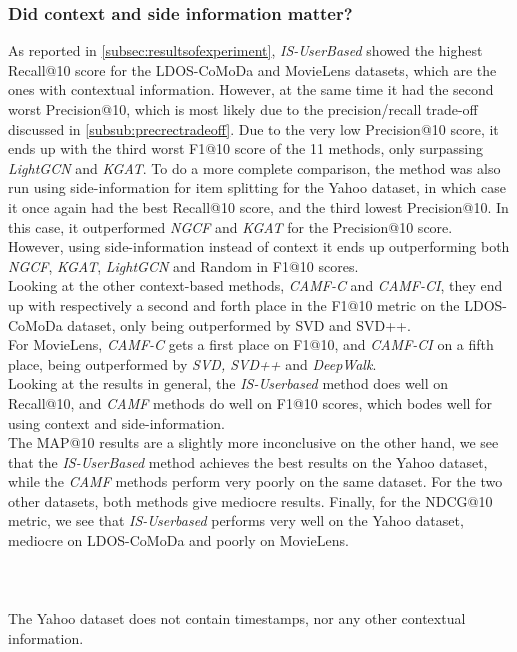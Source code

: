 \subsubsection{Did context and side information matter?}
As reported in \autoref{subsec:resultsofexperiment}, \textit{IS-UserBased} showed the highest Recall@10 score for the LDOS-CoMoDa and MovieLens datasets, which are the ones with contextual information.
However, at the same time it had the second worst Precision@10, which is most likely due to the precision/recall trade-off discussed in \autoref{subsub:precrectradeoff}.
Due to the very low Precision@10 score, it ends up with the third worst F1@10 score of the 11 methods, only surpassing \textit{LightGCN} and \textit{KGAT}.
To do a more complete comparison, the method was also run using side-information for item splitting for the Yahoo dataset, in which case it once again had the best Recall@10 score, and the third lowest Precision@10.
In this case, it outperformed \textit{NGCF} and \textit{KGAT} for the Precision@10 score.
However, using side-information instead of context it ends up outperforming both \textit{NGCF}, \textit{KGAT}, \textit{LightGCN} and Random in F1@10 scores.\\
Looking at the other context-based methods, \textit{CAMF-C} and \textit{CAMF-CI}, they end up with respectively a second and forth place in the F1@10 metric on the LDOS-CoMoDa dataset, only being outperformed by SVD and SVD++.\\
For MovieLens, \textit{CAMF-C} gets a first place on F1@10, and \textit{CAMF-CI} on a fifth place, being outperformed by \textit{SVD, SVD++} and \textit{DeepWalk}.\\
Looking at the results in general, the \textit{IS-Userbased} method does well on Recall@10, and \textit{CAMF} methods do well on F1@10 scores, which bodes well for using context and side-information.\\
The MAP@10 results are a slightly more inconclusive on the other hand, we see that the \textit{IS-UserBased} method achieves the best results on the Yahoo dataset, while the \textit{CAMF} methods perform very poorly on the same dataset.
For the two other datasets, both methods give mediocre results.
Finally, for the NDCG@10 metric, we see that \textit{IS-Userbased} performs very well on the Yahoo dataset, mediocre on LDOS-CoMoDa and poorly on MovieLens.\\\\
\\\\
The Yahoo dataset does not contain timestamps, nor any other contextual information.
